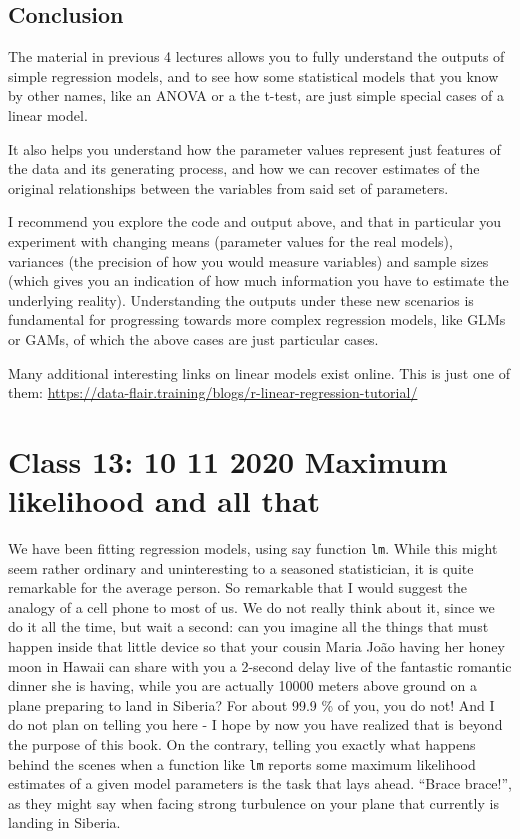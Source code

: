 \documentclass[
]{book}
\begin{document}
\hypertarget{conclusion}{%
\section{Conclusion}\label{conclusion}}

The material in previous 4 lectures allows you to fully understand the outputs of simple regression models, and to see how some statistical models that you know by other names, like an ANOVA or a the t-test, are just simple special cases of a linear model.

It also helps you understand how the parameter values represent just features of the data and its generating process, and how we can recover estimates of the original relationships between the variables from said set of parameters.

I recommend you explore the code and output above, and that in particular you experiment with changing means (parameter values for the real models), variances (the precision of how you would measure variables) and sample sizes (which gives you an indication of how much information you have to estimate the underlying reality). Understanding the outputs under these new scenarios is fundamental for progressing towards more complex regression models, like GLMs or GAMs, of which the above cases are just particular cases.

Many additional interesting links on linear models exist online. This is just one of them: \url{https://data-flair.training/blogs/r-linear-regression-tutorial/}

\hypertarget{aula12}{%
\chapter{Class 13: 10 11 2020 Maximum likelihood and all that}\label{aula12}}

We have been fitting regression models, using say function \texttt{lm}. While this might seem rather ordinary and uninteresting to a seasoned statistician, it is quite remarkable for the average person. So remarkable that I would suggest the analogy of a cell phone to most of us. We do not really think about it, since we do it all the time, but wait a second: can you imagine all the things that must happen inside that little device so that your cousin Maria João having her honey moon in Hawaii can share with you a 2-second delay live of the fantastic romantic dinner she is having, while you are actually 10000 meters above ground on a plane preparing to land in Siberia? For about 99.9 \% of you, you do not! And I do not plan on telling you here - I hope by now you have realized that is beyond the purpose of this book. On the contrary, telling you exactly what happens behind the scenes when a function like \texttt{lm} reports some maximum likelihood estimates of a given model parameters is the task that lays ahead. ``Brace brace!'', as they might say when facing strong turbulence on your plane that currently is landing in Siberia.
\end{document}
